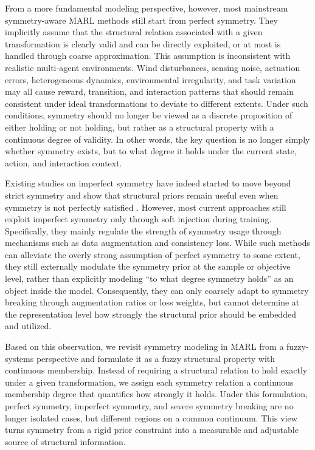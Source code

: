 \documentclass[lettersize,journal]{IEEEtran}
\begin{document}
From a more fundamental modeling perspective, however, most mainstream symmetry-aware MARL methods still start from perfect symmetry. They implicitly assume that the structural relation associated with a given transformation is clearly valid and can be directly exploited, or at most is handled through coarse approximation. This assumption is inconsistent with realistic multi-agent environments. Wind disturbances, sensing noise, actuation errors, heterogeneous dynamics, environmental irregularity, and task variation may all cause reward, transition, and interaction patterns that should remain consistent under ideal transformations to deviate to different extents. Under such conditions, symmetry should no longer be viewed as a discrete proposition of either holding or not holding, but rather as a structural property with a continuous degree of validity. In other words, the key question is no longer simply whether symmetry exists, but to what degree it holds under the current state, action, and interaction context.

Existing studies on imperfect symmetry have indeed started to move beyond strict symmetry and show that structural priors remain useful even when symmetry is not perfectly satisfied \cite{partialsym2024}. However, most current approaches still exploit imperfect symmetry only through soft injection during training. Specifically, they mainly regulate the strength of symmetry usage through mechanisms such as data augmentation and consistency loss. While such methods can alleviate the overly strong assumption of perfect symmetry to some extent, they still externally modulate the symmetry prior at the sample or objective level, rather than explicitly modeling ``to what degree symmetry holds'' as an object inside the model. Consequently, they can only coarsely adapt to symmetry breaking through augmentation ratios or loss weights, but cannot determine at the representation level how strongly the structural prior should be embedded and utilized.

Based on this observation, we revisit symmetry modeling in MARL from a fuzzy-systems perspective and formulate it as a fuzzy structural property with continuous membership. Instead of requiring a structural relation to hold exactly under a given transformation, we assign each symmetry relation a continuous membership degree that quantifies how strongly it holds. Under this formulation, perfect symmetry, imperfect symmetry, and severe symmetry breaking are no longer isolated cases, but different regions on a common continuum. This view turns symmetry from a rigid prior constraint into a measurable and adjustable source of structural information.
\end{document}
